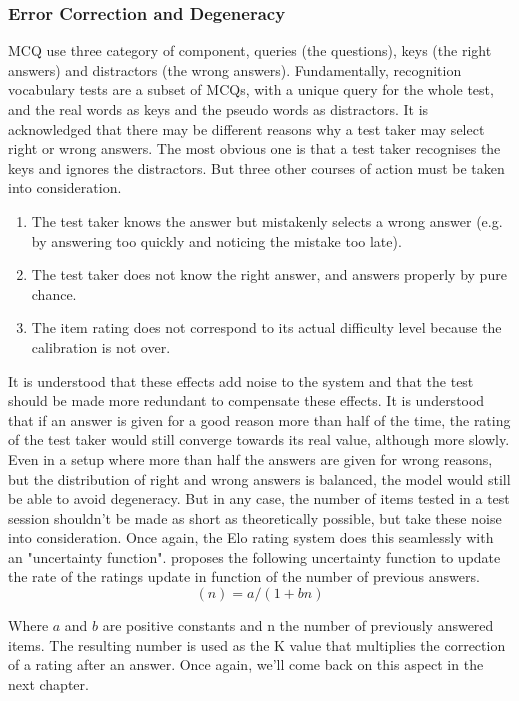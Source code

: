         \subsubsection{Error Correction and Degeneracy}
MCQ use three category of component, queries (the questions), keys (the right answers) and distractors (the wrong answers). Fundamentally, recognition vocabulary tests are a subset of MCQs, with a unique query for the whole test, and the real words as keys and the pseudo words as distractors. It is acknowledged that there may be different reasons why a test taker may select right or wrong answers. The most obvious one is that a test taker recognises the keys and ignores the distractors. But three other courses of action must be taken into consideration.
\begin{enumerate}
    \item The test taker knows the answer but mistakenly selects a wrong answer (e.g. by answering too quickly and noticing the mistake too late).
    \item The test taker does not know the right answer, and answers properly by pure chance.
    \item The item rating does not correspond to its actual difficulty level because the calibration is not over.
\end{enumerate}
It is understood that these effects add noise to the system and that the test should be made more redundant to compensate these effects. It is understood that if an answer is given for a good reason more than half of the time, the rating of the test taker would still converge towards its real value, although more slowly. Even in a setup where more than half the answers are given for wrong reasons, but the distribution of right and wrong answers is balanced, the model would still be able to avoid degeneracy. But in any case, the number of items tested in a test session shouldn't be made as short as theoretically possible, but take these noise into consideration. Once again, the Elo rating system does this seamlessly with an "uncertainty function". \cite{pelanek_applications_2016} proposes the following uncertainty function to update the rate of the ratings update in function of the number of previous answers.
\begin{equation}
    (n)=a/(1 + bn)
    \label{uncertainty-function}
\end{equation}

Where $a$ and $b$ are positive constants and n the number of previously answered items. The resulting number is used as the K value that multiplies the correction of a rating after an answer. Once again, we'll come back on this aspect in the next chapter.

